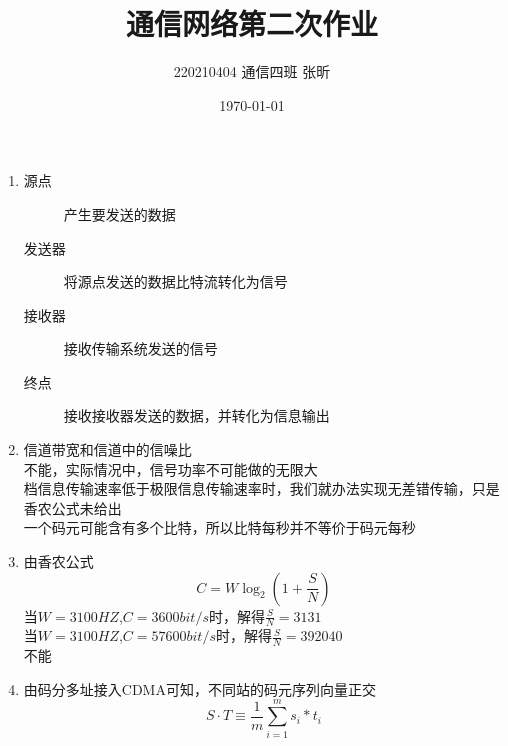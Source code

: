 \documentclass{article}
\title{\zihao{2} 通信网络第二次作业}
\author{220210404 通信四班 张昕}
\date{\today}
\begin{document}
\maketitle
{}
\begin{enumerate}
    \item {}
    \begin{description}
        \item[源点] 产生要发送的数据
        \item[发送器] 将源点发送的数据比特流转化为信号
        \item[接收器] 接收传输系统发送的信号
        \item[终点] 接收接收器发送的数据，并转化为信息输出    
    \end{description}
    \item 信道带宽和信道中的信噪比 \\
          不能，实际情况中，信号功率不可能做的无限大 \\
          档信息传输速率低于极限信息传输速率时，我们就办法实现无差错传输，只是香农公式未给出  \\
          一个码元可能含有多个比特，所以比特每秒并不等价于码元每秒
    \item 由香农公式
          \begin{equation}
            C=W\log_2(1+\frac{S}{N})
          \end{equation}
          当$W=3100HZ$,$C=3600bit/s$时，解得$\frac{S}{N}=3131$ \\
          当$W=3100HZ$,$C=57600bit/s$时，解得$\frac{S}{N}=392040$ \\
          不能
    \item 由码分多址接入CDMA可知，不同站的码元序列向量正交
          \begin{equation}
            S \cdot T \equiv \frac{1}{m}\sum_{i=1}^{m}s_i*t_i
          \end{equation}

\end{enumerate}
\end{document}

